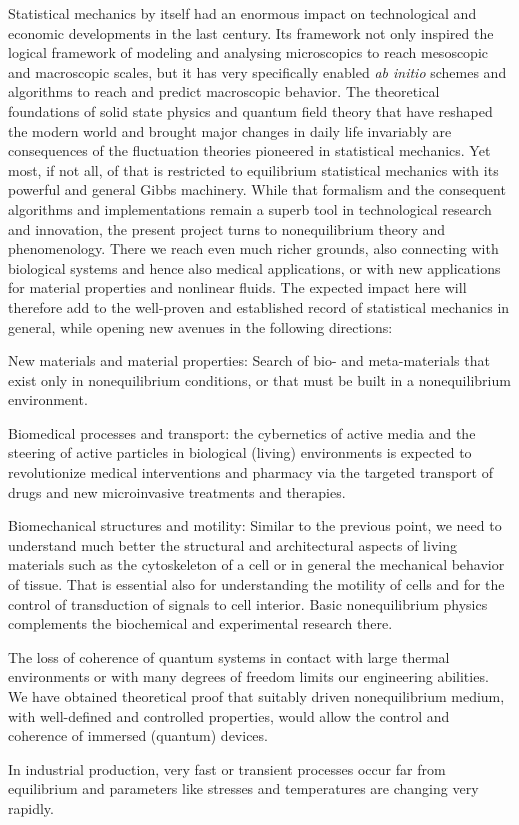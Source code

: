 Statistical mechanics by itself had an enormous impact on technological and economic
developments in the last century. Its framework not only inspired the logical framework
of modeling and analysing microscopics to reach mesoscopic and macroscopic scales, but it
has very specifically enabled {\it ab initio} schemes and algorithms to reach and predict
macroscopic behavior.
%
The theoretical foundations of solid state physics and quantum field theory that have reshaped the
modern world and brought major changes in daily life invariably are consequences of the
fluctuation theories pioneered in statistical mechanics. Yet most, if not all, of that is
restricted to equilibrium statistical mechanics with its powerful and general Gibbs
machinery.
%
While that formalism and the consequent algorithms and implementations remain a superb tool
in technological research and innovation, the present project turns to nonequilibrium theory
and phenomenology. There we reach even much richer grounds, also connecting with biological
systems and hence also medical applications, or with new applications for material properties and nonlinear fluids. The expected impact here will therefore add to
the well-proven and established record of statistical mechanics in general, while opening
new avenues in the following directions:
\begin{compactitem}
\item New materials and material properties: Search of bio- and meta-materials that exist
only in nonequilibrium conditions, or that must be built in a nonequilibrium environment.
\item Biomedical processes and transport: the cybernetics of active media and the steering
of active particles in biological (living) environments is expected to revolutionize medical
interventions and pharmacy via the targeted transport of drugs and new microinvasive
treatments and therapies.
\item Biomechanical structures and motility: Similar to the previous point, we need to
understand much better the structural and architectural aspects of living materials such as
the cytoskeleton of a cell or in general the mechanical behavior of tissue. That is
essential also for understanding the motility of cells and for the control of transduction
of signals to cell interior. Basic nonequilibrium physics complements the biochemical
and experimental research there.
\item The loss of coherence of quantum systems in contact with large thermal environments or
with many degrees of freedom limits our engineering abilities. We have obtained theoretical
proof that suitably driven nonequilibrium medium, with well-defined and controlled
properties, would allow the control and coherence of immersed (quantum) devices.
%
\item In industrial production, very fast or transient processes occur far from equilibrium
and parameters like stresses and temperatures are changing very rapidly.
\end{compactitem}

